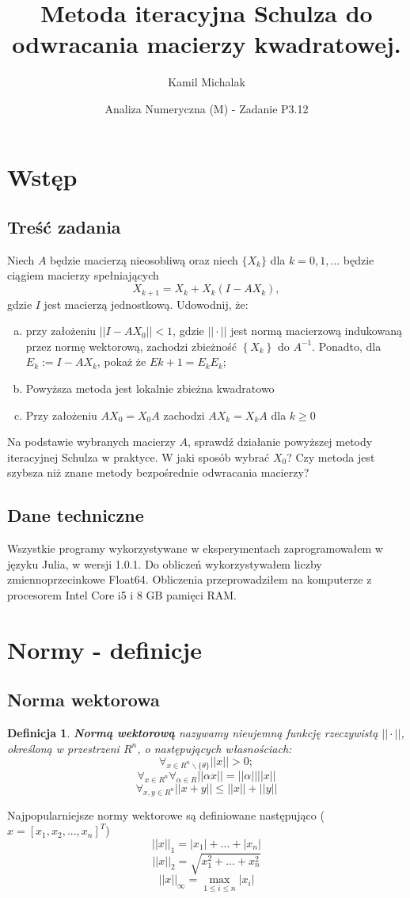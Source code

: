 \documentclass[11pt,a4paper]{article}
\title{Metoda iteracyjna Schulza do odwracania macierzy kwadratowej.}
\author{Kamil Michalak}
\date{Analiza Numeryczna (M) - Zadanie P3.12}
\newtheorem{defn}{Definicja}
\begin{document}
    \maketitle
    \section{Wstęp}
    \subsection{Treść zadania}
    Niech $A$ będzie macierzą nieosobliwą oraz niech $\{X_k\}$ dla $k = 0,1,...$ będzie ciągiem macierzy spełniających
    $$
        X_{k+1} = X_k + X_k(I - AX_k),
    $$
    gdzie $I$ jest macierzą jednostkową. Udowodnij, że:\\
    \begin{enumerate}[a)]
    \item przy założeniu $||I-AX_0|| < 1$, gdzie $||\cdot||$ jest normą macierzową indukowaną przez normę wektorową, zachodzi zbieżność $\left\{X_k\right\}$ do $A^{-1}$. Ponadto, dla $E_k:=I-AX_k$, pokaż że $E{k+1} = E_kE_k$;
    \item Powyższa metoda jest lokalnie zbieżna kwadratowo
    \item Przy założeniu $AX_0=X_0A$ zachodzi $AX_k=X_kA$ dla $k \ge 0$
    \end{enumerate}
    Na podstawie wybranych macierzy $A$, sprawdź działanie powyższej metody iteracyjnej Schulza w praktyce. W jaki sposób wybrać $X_0$? Czy metoda jest szybsza niż znane metody bezpośrednie odwracania macierzy?
    \subsection{Dane techniczne}
    Wszystkie programy wykorzystywane w eksperymentach zaprogramowałem w języku Julia, w wersji 1.0.1. Do obliczeń wykorzystywałem liczby zmiennoprzecinkowe Float64. Obliczenia przeprowadziłem na komputerze z procesorem Intel Core i5 i 8 GB pamięci RAM.

    \section{Normy - definicje}
    \subsection{Norma wektorowa}
    \begin{defn}
        \textbf{Normą wektorową} nazywamy nieujemną funkcję rzeczywistą $||\cdot||$, określoną w przestrzeni $R^n$, o następujących własnościach:
        $$\forall_{x \in R^n \backslash \{\theta\}} ||x|| > 0;$$
        $$\forall_{x \in R^n} \forall_{\alpha \in R} ||\alpha x|| = ||\alpha|| ||x||$$
        $$\forall_{x,y \in R^n} ||x+y|| \leq ||x|| + ||y||$$
    \end{defn}
    Najpopularniejsze normy wektorowe są definiowane następująco ($x=[x_1,x_2,...,x_n]^T$)
    $$||x||_1 = |x_1| + ... + |x_n|$$
    $$||x||_2 = \sqrt{x_1^2 + ... + x_n^2}$$
    $$||x||_\infty = \max_{1 \leq i \leq n} |x_i|$$
\end{document}
